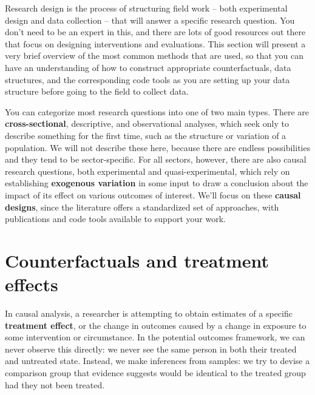
\begin{fullwidth}
Research design is the process of structuring field work
-- both experimental design and data collection --
that will answer a specific research question.
You don't need to be an expert in this,
and there are lots of good resources out there
that focus on designing interventions and evaluations.
This section will present a very brief overview
of the most common methods that are used,
so that you can have an understanding of
how to construct appropriate counterfactuals,
data structures, and the corresponding code tools
as you are setting up your data structure
before going to the field to collect data.

You can categorize most research questions into one of two main types.
There are \textbf{cross-sectional}, descriptive, and observational analyses,
which seek only to describe something for the first time,
such as the structure or variation of a population.
We will not describe these here,
because there are endless possibilities
and they tend to be sector-specific.
For all sectors, however, there are also causal research questions,
both experimental and quasi-experimental,
which rely on establishing \textbf{exogenous variation} in some input
to draw a conclusion about the impact of its effect
on various outcomes of interest.
We'll focus on these \textbf{causal designs}, since the literature
offers a standardized set of approaches, with publications
and code tools available to support your work.
\end{fullwidth}


\section{Counterfactuals and treatment effects}

In causal analysis, a researcher is attempting to obtain estimates
of a specific \textbf{treatment effect}, or the change in outcomes
caused by a change in exposure to some intervention or circumstance.\cite{abadie2018econometric}
In the potential outcomes framework,
we can never observe this directly:
we never see the same person in both their treated and untreated state.
Instead, we make inferences from samples:
we try to devise a comparison group that evidence suggests
would be identical to the treated group had they not been treated.

